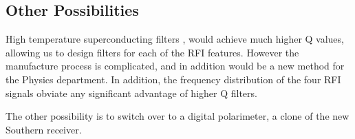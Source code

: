\subsection{Other Possibilities}

High temperature superconducting filters \cite{Futatsumori2008}, would achieve much higher Q values, allowing us to design filters for each of the RFI features. However the manufacture process is complicated, and in addition would be a new method for the Physics department. In addition, the frequency distribution of the four RFI signals obviate any significant advantage of higher Q filters.

The other possibility is to switch over to a digital polarimeter, a clone of the new Southern receiver. 